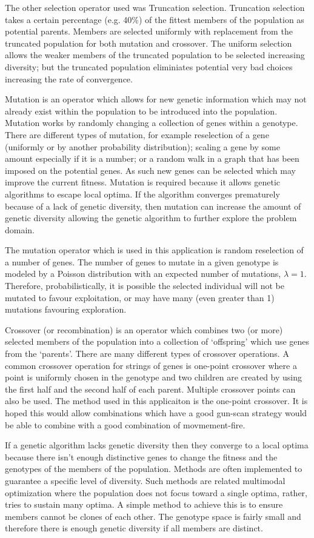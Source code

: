 The other selection operator used was Truncation selection. Truncation selection takes a certain percentage (e.g. 40\%) of the fittest members of the population as potential parents. Members are selected uniformly with replacement from the truncated population for both mutation and crossover. The uniform selection allows the weaker members of the truncated population to be selected increasing diversity; but the truncated population eliminiates potential very bad choices increasing the rate of convergence.

Mutation is an operator which allows for new genetic information which may not already exist within the population to be introduced into the population. Mutation works by randomly changing a collection of genes within a genotype. There are different types of mutation, for example reselection of a gene (uniformly or by another probability distribution); scaling a gene by some amount especially if it is a number; or a random walk in a graph that has been imposed on the potential genes. As such new genes can be selected which may improve the current fitness. Mutation is required because it allows genetic algorithms to escape local optima. If the algorithm converges prematurely because of a lack of genetic diversity, then mutation can increase the amount of genetic diversity allowing the genetic algorithm to further explore the problem domain.

The mutation operator which is used in this application is random reselection of a number of genes. The number of genes to mutate in a given genotype is modeled by a Poisson distribution with an expected number of mutations, $\lambda = 1$. Therefore, probabilistically, it is possible the selected individual will not be mutated to favour exploitation, or may have many (even greater than 1)  mutations favouring exploration.

Crossover (or recombination) is an operator which combines two (or more) selected members of the population into a collection of `offspring' which use genes from the `parents'. There are many different types of crossover operations. A common crossover operation for strings of genes is one-point crossover where a point is uniformly chosen in the genotype and two children are created by using the first half and the second half of each parent. Multiple crossover points can also be used. The method used in this applicaiton is the one-point crossover. It is hoped this would allow combinations which have a good gun-scan strategy would be able to combine with a good combination of movmement-fire.

If a genetic algorithm lacks genetic diversity then they converge to a local optima because there isn't enough distinctive genes to change the fitness and the genotypes of the members of the population. Methods are often implemented to guarantee a specific level of diversity. Such methods are related multimodal optimization where the population does not focus toward a single optima, rather, tries to sustain many optima. A simple method to achieve this is to ensure members cannot be clones of each other. The genotype space is fairly small and therefore there is enough genetic diversity if all members are distinct.
